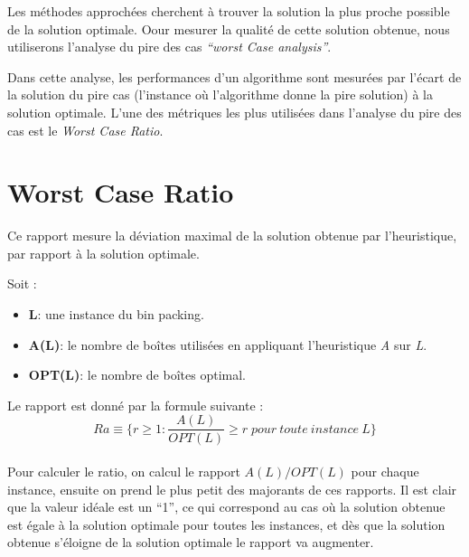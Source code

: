 \documentclass[class=article, crop=false]{standalone}
\begin{document}
Les méthodes approchées cherchent à trouver la solution la plus proche possible de la solution optimale.
Oour mesurer la qualité de cette solution obtenue, nous utiliserons l’analyse du pire des cas \emph{“worst Case analysis”}.

Dans cette analyse, les performances d’un algorithme sont mesurées par l’écart de la solution du pire cas
(l’instance où l’algorithme donne la pire solution) à la solution optimale.
L’une des métriques les plus utilisées dans l’analyse du pire des cas est le \emph{Worst Case Ratio}.

\section*{Worst Case Ratio}
Ce rapport mesure la déviation maximal de la solution obtenue par l’heuristique, par rapport à la solution optimale. 

Soit :
\begin{itemize}
    \item \textbf{L}: une instance du bin packing.
    \item \textbf{A(L)}: le nombre de boîtes utilisées en appliquant l’heuristique \emph{A} sur \emph{L}.
    \item \textbf{OPT(L)}: le nombre de boîtes optimal.
\end{itemize}
Le rapport est donné par la formule suivante :\\
\[ Ra\equiv \{r \geq 1 : \frac{A(L)}{OPT(L)} \geq r \; pour\: toute\: instance\: L\}\]\\
Pour calculer le ratio, on calcul le rapport  $A(L)/OPT(L)$  pour chaque instance, ensuite on prend le plus petit des majorants de ces rapports.
Il est clair que la valeur idéale est un “1”, ce qui correspond au cas où la solution obtenue est  égale à la solution optimale pour toutes les instances, et dès que la solution obtenue s’éloigne de la solution optimale le rapport va augmenter.
\end{document}
